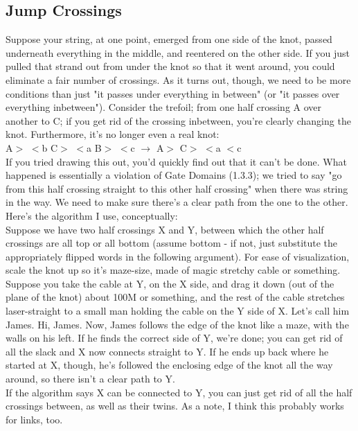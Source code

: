 \documentclass[twoside]{report}
\begin{document}
\subsection{Jump Crossings}
Suppose your string, at one point, emerged from one side of the knot, passed underneath everything in the middle, and reentered on the other side.  If you just pulled that strand out from under the knot so that it went around, you could eliminate a fair number of crossings.  As it turns out, though, we need to be more conditions than just "it passes under everything in between" (or "it passes over everything inbetween").  Consider the trefoil; from one half crossing A over another to C; if you get rid of the crossing inbetween, you're clearly changing the knot.  Furthermore, it's no longer even a real knot:\\
A$>$ $<$b C$>$ $<$a B$>$ $<$c $\to$ A$>$ C$>$ $<$a $<$c\\
If you tried drawing this out, you'd quickly find out that it can't be done.  What happened is essentially a violation of Gate Domains (1.3.3); we tried to say "go from this half crossing straight to this other half crossing" when there was string in the way.  We need to make sure there's a clear path from the one to the other.  Here's the algorithm I use, conceptually:\\
Suppose we have two half crossings X and Y, between which the other half crossings are all top or all bottom (assume bottom - if not, just substitute the appropriately flipped words in the following argument).  For ease of visualization, scale the knot up so it's maze-size, made of magic stretchy cable or something.  Suppose you take the cable at Y, on the X side, and drag it down (out of the plane of the knot) about 100M or something, and the rest of the cable stretches laser-straight to a small man holding the cable on the Y side of X.  Let's call him James.  Hi, James.  Now, James follows the edge of the knot like a maze, with the walls on his left.  If he finds the correct side of Y, we're done; you can get rid of all the slack and X now connects straight to Y.  If he ends up back where he started at X, though, he's followed the enclosing edge of the knot all the way around, so there isn't a clear path to Y.\\
If the algorithm says X can be connected to Y, you can just get rid of all the half crossings between, as well as their twins.  As a note, I think this probably works for links, too.
\end{document}
